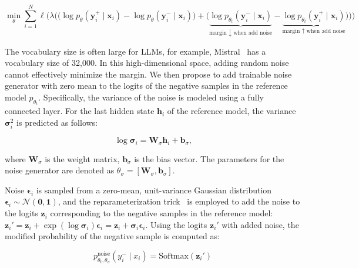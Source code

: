 \begin{equation}
\label{eq4}
        \min_{\theta} \sum_{i=1}^N \ell \Bigg( \lambda \bigg( \Big( \log p_{\theta}(\mathbf{y}_i^+ \mid \mathbf{x}_i) - \log p_{\theta}(\mathbf{y}_i^- \mid \mathbf{x}_i) \Big) + \Big( \underbrace{\log p_{\theta_t}(\mathbf{y}_i^- \mid \mathbf{x}_i)}_{\text{margin $\downarrow$ when add noise}} - \underbrace{\log p_{\theta_t}(\mathbf{y}_i^+ \mid \mathbf{x}_i)}_{ \text{margin $\uparrow$ when add noise}} \Big) \bigg) \Bigg)
\end{equation}

The vocabulary size is often large for LLMs, for example, Mistral~\citep{jiang2023mistral7b} has a vocabulary size of 32,000. In this high-dimensional space, adding random noise cannot effectively minimize the margin. We then propose to add trainable noise generator with zero mean to the logits of the negative samples in the reference model \( p_{\theta_t} \). Specifically, the variance of the noise is modeled using a fully connected layer. For the last hidden state \( \mathbf{h}_i \) of the reference model, the variance \( \boldsymbol{\sigma}_i^2 \) is predicted as follows:

\begin{equation}~\label{eq:noise-generation}
\log \boldsymbol{\sigma}_i = \mathbf{W}_{\sigma} \mathbf{h}_i + \mathbf{b}_{\sigma},
\end{equation}

where \( \mathbf{W}_{\sigma} \) is the weight matrix, \( \mathbf{b}_{\sigma} \) is the bias vector. The parameters for the noise generator are denoted as $\theta_{\sigma} = [\mathbf{W}_{\sigma}, \mathbf{b}_{\sigma}]$.


Noise \( \boldsymbol{\epsilon}_i \) is sampled from a zero-mean, unit-variance Gaussian distribution  $\boldsymbol{\epsilon}_i \sim \mathcal{N}\left( \mathbf{0}, \mathbf{1} \right) $, and the reparameterization trick~\citep{kingma2022autoencodingvariationalbayes} is employed to add the noise to the logits \( \mathbf{z}_i \) corresponding to the negative samples in the reference model: $ \mathbf{z}_i' = \mathbf{z}_i + \exp(\log\boldsymbol{\sigma}_i) \boldsymbol{\epsilon}_i = \mathbf{z}_i + \boldsymbol{\sigma}_i\boldsymbol{\epsilon}_i $. Using the logits \( \mathbf{z}_i' \) with added noise, the modified probability of the negative sample is computed as:



\begin{equation}
p_{\theta_t,\theta_{\sigma}}^{\text{noise}}(y_i^- \mid x_i) = \text{Softmax}(\mathbf{z}_i')
\end{equation}

